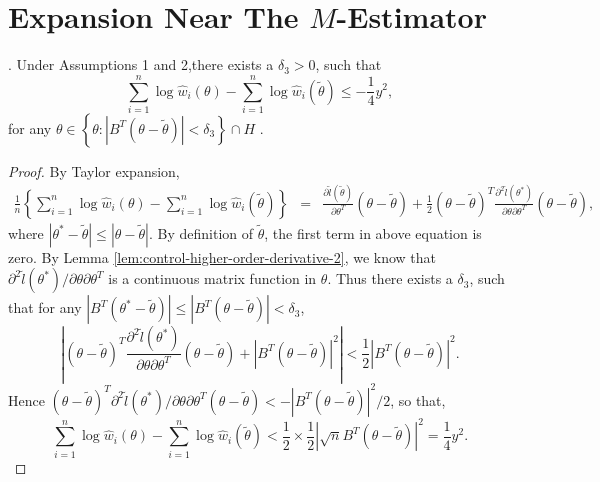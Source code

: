 \section{Expansion Near The $M$-Estimator}
\begin{lemma}
\label{lem:near-mean-2nd-order-bound-2}.  Under  Assumptions 1 and 2,there exists a $\delta_{3}>0$,
such that 
\[
\sum_{i=1}^{n}\log\hat{w}_{i}\left(\theta\right)-\sum_{i=1}^{n}\log\hat{w}_{i}\left(\tilde{\theta}\right)\le-\frac{1}{4}y^{2},
\]
for any $\theta\in\left\{ \theta:\left|B^T\left(\theta-\tilde{\theta}\right)\right|<\delta_{3}\right\} \cap H$
. \end{lemma}
\begin{proof}
By Taylor expansion, 
\begin{eqnarray*}
\frac{1}{n}\left\{ \sum_{i=1}^{n}\log\hat{w}_{i}\left(\theta\right)-\sum_{i=1}^{n}\log\hat{w}_{i}\left(\tilde{\theta}\right)\right\}  & = & \frac{\partial\tilde{l}\left(\tilde{\theta}\right)}{\partial\theta^T}\left(\theta-\tilde{\theta}\right)+\frac{1}{2}\left(\theta-\tilde{\theta}\right)^T\frac{\partial^{2}\tilde{l}\left(\theta^{*}\right)}{\partial\theta \partial\theta^T}\left(\theta-\tilde{\theta}\right),
\end{eqnarray*}
where $\left|\theta^{*}-\tilde{\theta}\right|\le\left|\theta-\tilde{\theta}\right|$.
By definition of $\tilde{\theta}$, the first term in above equation
is zero. By Lemma \ref{lem:control-higher-order-derivative-2}, we
know that ${\partial^{2}\tilde{l}\left(\theta^{*}\right)} / {\partial\theta \partial\theta^T}$
is a continuous matrix function in $\theta$. Thus there exists a $\delta_{3}$,
such that for any $\left|B^T \left(\theta^{*}-\tilde{\theta}\right)\right|\le\left|B^T\left(\theta-\tilde{\theta}\right)\right|<\delta_{3}$,
\[
\left|\left(\theta-\tilde{\theta}\right)^T\frac{\partial^{2}\tilde{l}\left(\theta^{*}\right)}{\partial\theta \partial\theta^T}\left(\theta-\tilde{\theta}\right)+\left|B^T\left(\theta-\tilde{\theta}\right)\right|^{2}\right|<\frac{1}{2}\left|B^T\left(\theta-\tilde{\theta}\right)\right|^{2}.
\]
Hence $\left(\theta-\tilde{\theta}\right)^T{\partial^{2}\tilde{l}\left(\theta^{*}\right)} / {\partial\theta \partial\theta^T}\left(\theta-\tilde{\theta}\right)<-\left|B^T\left(\theta-\tilde{\theta}\right)\right|^{2}/2$,
 so that, 
\[
\sum_{i=1}^{n}\log\hat{w}_{i}\left(\theta\right)-\sum_{i=1}^{n}\log\hat{w}_{i}\left(\tilde{\theta}\right)<\frac{1}{2}\times\frac{1}{2}\left|\sqrt{n}B^T\left(\theta-\tilde{\theta}\right)\right|^{2}=\frac{1}{4}y^{2}.
\]
\end{proof}
